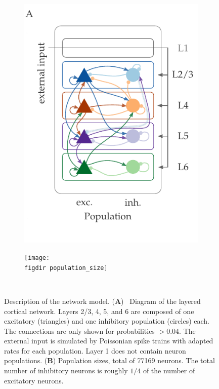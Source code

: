 \begin{figure}[tb]
    \centering 
    \begin{subfigure}[b]{0.6\textwidth} 
        \includegraphics{../figures/diagram_colored_print}
        \label{fig:diagram}
    \end{subfigure}
    \begin{subfigure}[b]{0.35\textwidth}
        \texttt{[image: \\figdir population\_size]}
        \label{fig:population_size}
    \end{subfigure} ~
    \caption[Diagram of model and population sizes]{
        Description of the network model. 
        (\textbf{A})~%
        Diagram of the layered cortical network. 
        Layers 2/3, 4, 5, and 6 are composed of one excitatory
        (triangles) and one inhibitory population (circles) each.
        The connections are only shown for probabilities $>0.04$. 
        The external input is simulated by Poissonian spike trains
        with adapted rates for each population. 
        Layer 1 does not contain neuron populations.
        (\textbf{B})
        Population sizes, total of 77169 neurons. The total number of inhibitory neurons is roughly
        $1 / 4$ of the number of excitatory neurons. 
    }
    \label{fig:model_description} 
\end{figure}
